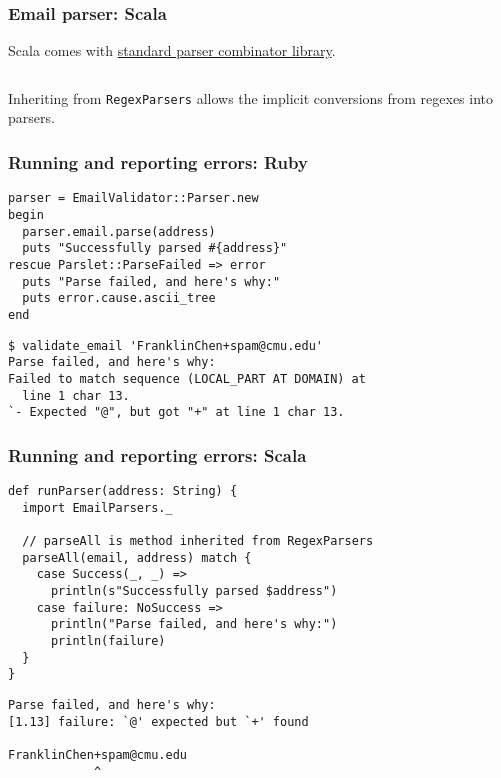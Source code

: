\begin{frame}[fragile]
  \frametitle{Email parser: Scala}

  Scala comes with \href{http://www.scala-lang.org/api/current/index.html\#scala.util.parsing.combinator.Parsers}{standard parser combinator library}.

  \inputminted{scala}{extra/EmailParsers.scala}

  Inheriting from \texttt{RegexParsers} allows the implicit conversions from regexes into parsers.
\end{frame}


\begin{frame}[fragile]
  \frametitle{Running and reporting errors: Ruby}

  \begin{verbatim}
parser = EmailValidator::Parser.new
begin
  parser.email.parse(address)
  puts "Successfully parsed #{address}"
rescue Parslet::ParseFailed => error
  puts "Parse failed, and here's why:"
  puts error.cause.ascii_tree
end
  \end{verbatim}

  \begin{verbatim}
$ validate_email 'FranklinChen+spam@cmu.edu'
Parse failed, and here's why:
Failed to match sequence (LOCAL_PART AT DOMAIN) at
  line 1 char 13.
`- Expected "@", but got "+" at line 1 char 13.
  \end{verbatim}
\end{frame}

\begin{frame}[fragile]
  \frametitle{Running and reporting errors: Scala}

  \begin{verbatim}
def runParser(address: String) {
  import EmailParsers._

  // parseAll is method inherited from RegexParsers
  parseAll(email, address) match {
    case Success(_, _) =>
      println(s"Successfully parsed $address")
    case failure: NoSuccess =>
      println("Parse failed, and here's why:")
      println(failure)
  }
}
  \end{verbatim}

  \begin{verbatim}
Parse failed, and here's why:
[1.13] failure: `@' expected but `+' found

FranklinChen+spam@cmu.edu
            ^
  \end{verbatim}
\end{frame}


